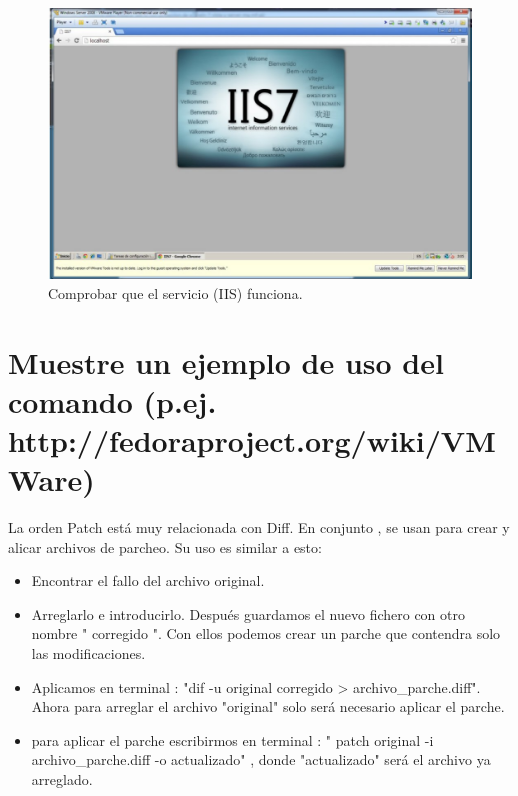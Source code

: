 \begin{figure}[H]
\begin{center}
\includegraphics[scale=0.4]{Imagenes/pregunta12.eps}
\caption{Comprobar que el servicio (IIS) funciona.}
\end{center}

\end{figure}




\section{Muestre un ejemplo de uso del comando (p.ej. http://fedoraproject.org/wiki/VMWare)}

La orden Patch está muy relacionada con Diff. En conjunto , se usan para crear y alicar archivos de parcheo. Su uso es similar a esto:
\begin{itemize}
\item Encontrar el fallo del archivo original.
\item Arreglarlo e introducirlo. Después guardamos el nuevo fichero con otro nombre " corregido ". Con ellos podemos crear un parche que contendra solo las modificaciones. 
\item Aplicamos en terminal : "dif -u original corregido > archivo\_parche.diff".
Ahora para arreglar el archivo "original" solo será necesario aplicar el parche.

\item para aplicar el parche escribirmos en terminal : " patch original -i archivo\_parche.diff -o  actualizado" , donde "actualizado" será el archivo ya arreglado.
 
\end{itemize}

